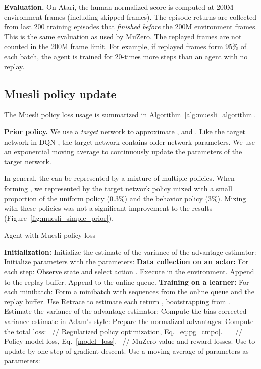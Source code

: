 \documentclass{article}
\begin{document}
\textbf{Evaluation.} On Atari, the human-normalized score is computed at 200M environment frames (including skipped frames). The episode returns are collected from last 200 training episodes that \emph{finished before} the 200M environment frames. This is the same evaluation as used by MuZero. The replayed frames are not counted in the 200M frame limit. For example, if replayed frames form 95\% of each batch, the agent is trained for 20-times more steps than an agent with no replay.

\subsection{Muesli policy update}

The Muesli policy loss usage is summarized in Algorithm~\ref{alg:muesli_algorithm}.

\textbf{Prior policy.} We use a \emph{target} network to approximate ,  and . Like the target network in DQN \cite{mnih2015}, the target network contains older network parameters. We use an exponential moving average to continuously update the parameters of the target network.

In general, the  can be represented by a mixture of multiple policies. When forming , we represented   by the target network policy mixed with a small proportion of the uniform policy (0.3\%) and the behavior policy (3\%). Mixing with these policies was not a significant improvement to the results (Figure~\ref{fig:muesli_simple_prior}).

\begin{algorithm}[htb]
\caption{Agent with Muesli policy loss}
\label{alg:muesli_algorithm}
\begin{algorithmic}
\STATE \textbf{Initialization:}
\STATE Initialize the estimate of the variance of the advantage estimator:
\STATE \quad 
\STATE \quad 
\STATE Initialize  parameters with the  parameters:
\STATE \quad 
\STATE
\STATE \textbf{Data collection on an actor:}
\STATE For each step:
\STATE \quad Observe state  and select action .
\STATE \quad Execute  in the environment.
\STATE \quad Append  to the replay buffer.
\STATE \quad Append  to the online queue.
\STATE
\STATE \textbf{Training on a learner:}
\STATE For each minibatch:
\STATE \quad Form a minibatch  with sequences from the online queue and the replay buffer.
\STATE \quad Use Retrace to estimate each return , bootstrapping from .
\STATE \quad Estimate the variance of the advantage estimator:
\STATE \quad \quad 
\STATE \quad Compute the bias-corrected variance estimate in Adam's style:
\STATE \quad \quad 
\STATE \quad \quad 
\STATE \quad Prepare the normalized advantages:
\STATE \quad \quad 
\STATE \quad Compute the total loss:
\STATE \quad \quad 
\STATE \quad \quad\quad  \quad\qquad\qquad~// Regularized policy optimization, Eq.~\ref{eq:pg_cmpo}.
\STATE \quad \quad\quad  \quad\qquad\qquad\qquad~~~// Policy model loss, Eq.~\ref{model_loss}.
\STATE \quad \quad\quad  \qquad ~// MuZero value and reward losses.
\STATE \quad Use  to update  by one step of gradient descent.
\STATE \quad Use a moving average of  parameters as  parameters:
\STATE \quad \quad 
\end{algorithmic}
\end{algorithm}
\end{document}

